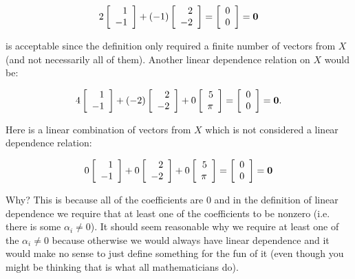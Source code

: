 \documentclass[12pt]{article}
\begin{document}
\[ 2\left[ \begin{array}{r} 1  \\ -1  \end{array} \right] + (-1) \left[ \begin{array}{r} 2  \\ -2  \end{array} \right] = \left[ \begin{array}{r} 0  \\ 0  \end{array} \right] = {\bf 0} \]

\noindent is acceptable since the definition only required a finite number of vectors from $X$ (and not necessarily all of them).  Another linear dependence relation on $X$ would be:

\[ 4 \left[ \begin{array}{r} 1  \\ -1  \end{array} \right] + (-2) \left[ \begin{array}{r} 2  \\ -2  \end{array} \right] + 0 \left[ \begin{array}{r} 5  \\ \pi  \end{array} \right] = \left[ \begin{array}{r} 0  \\ 0  \end{array} \right] = {\bf 0}. \]

Here is a linear combination of vectors from $X$ which is not considered a linear dependence relation:

\[ 0\left[ \begin{array}{r} 1  \\ -1  \end{array} \right] + 0 \left[ \begin{array}{r} 2  \\ -2  \end{array} \right] + 0 \left[ \begin{array}{r} 5  \\ \pi  \end{array} \right] = \left[ \begin{array}{r} 0  \\ 0  \end{array} \right] = {\bf 0} \]

Why?  This is because all of the coefficients are 0 and in the definition of linear dependence we require that at least one of the coefficients to be nonzero (i.e. there is some $\alpha_i \neq 0$).  It should seem reasonable why we require at least one of the $\alpha_i \neq 0$ because otherwise we would always have linear dependence and it would make no sense to just define something for the fun of it (even though you might be thinking that is what all mathematicians do).
\end{document}
